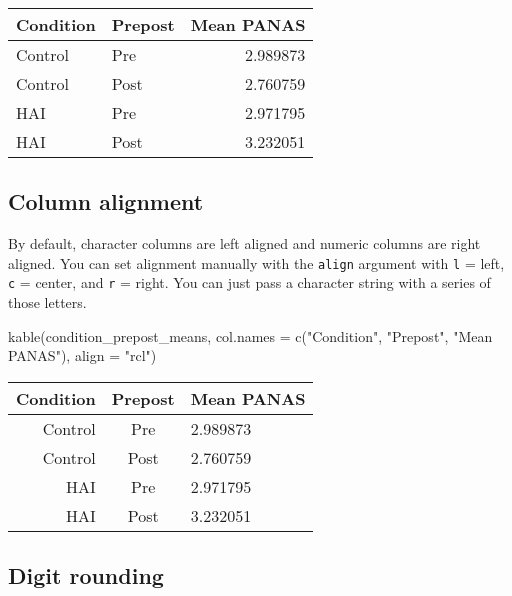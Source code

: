 \documentclass[
  doc]{apa6}
\newenvironment{Shaded}{\begin{snugshade}}{\end{snugshade}}
\newcommand{\AttributeTok}[1]{\textcolor[rgb]{0.77,0.63,0.00}{#1}}
\newcommand{\FunctionTok}[1]{\textcolor[rgb]{0.00,0.00,0.00}{#1}}
\newcommand{\NormalTok}[1]{#1}
\newcommand{\StringTok}[1]{\textcolor[rgb]{0.31,0.60,0.02}{#1}}
\begin{document}
\begin{tabular}{l|l|r}
\hline
Condition & Prepost & Mean PANAS\\
\hline
Control & Pre & 2.989873\\
\hline
Control & Post & 2.760759\\
\hline
HAI & Pre & 2.971795\\
\hline
HAI & Post & 3.232051\\
\hline
\end{tabular}

\newpage

\hypertarget{column-alignment}{%
\subsection{Column alignment}\label{column-alignment}}

By default, character columns are left aligned and numeric columns are right aligned. You can set alignment manually with the \texttt{align} argument with \texttt{l} = left, \texttt{c} = center, and \texttt{r} = right. You can just pass a character string with a series of those letters.

\begin{Shaded}
\begin{Highlighting}[]
\FunctionTok{kable}\NormalTok{(condition\_prepost\_means,}
      \AttributeTok{col.names =} \FunctionTok{c}\NormalTok{(}\StringTok{"Condition"}\NormalTok{, }\StringTok{"Prepost"}\NormalTok{, }\StringTok{"Mean PANAS"}\NormalTok{), }
      \AttributeTok{align =} \StringTok{"rcl"}\NormalTok{)}
\end{Highlighting}
\end{Shaded}

\begin{tabular}{r|c|l}
\hline
Condition & Prepost & Mean PANAS\\
\hline
Control & Pre & 2.989873\\
\hline
Control & Post & 2.760759\\
\hline
HAI & Pre & 2.971795\\
\hline
HAI & Post & 3.232051\\
\hline
\end{tabular}

\newpage

\hypertarget{digit-rounding}{%
\subsection{Digit rounding}\label{digit-rounding}}
\end{document}
